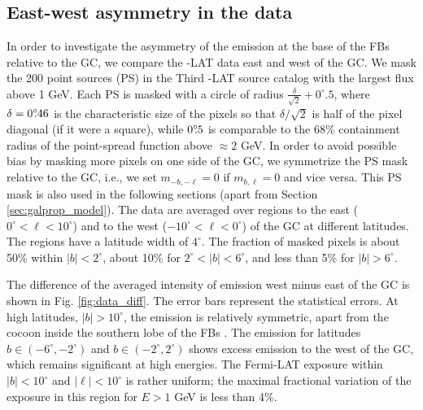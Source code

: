 \subsection{East-west  asymmetry in the data}
\label{sec:data_diff}

In order to investigate the asymmetry of the emission at the base of the FBs relative to the GC, 
we compare the \Fermi-LAT data east and west of the GC. 
We mask the 200 point sources (PS) in the Third \Fermi-LAT source catalog \citep[3FGL,][]{2015ApJS..218...23A}
with the largest flux above 1 GeV.
Each PS is masked with a circle of radius $\frac{\delta}{\sqrt{2}} + 0^\circ\!\!.5$, where $\delta = 0^\circ\!\!.46$ is the characteristic size of the pixels
so that ${\delta}/{\sqrt{2}}$ is half of the pixel diagonal (if it were a square), while $0^\circ\!\!.5$ is comparable to 
the 68\% containment radius of the point-spread function above $\approx 2$ GeV.
In order to avoid possible bias by masking more pixels on one side of the GC,
we symmetrize the PS mask relative to the GC, i.e., we set $m_{-b, -\ell} = 0$ if $m_{b, \ell} = 0$ and vice versa.
This PS mask is also used in the following sections (apart from Section \ref{sec:galprop_model}).
The data are averaged over regions to the east ($0^\circ < \ell < 10^\circ$) and to the west ($-10^\circ < \ell  <  0^\circ$) 
of the GC at different latitudes. 
The regions have a latitude width of $4^\circ$. 
The fraction of masked pixels is about 50\% within $|b| < 2^\circ$, about 10\% for $2^\circ < |b| < 6^\circ$, and less than  5\% 
for $|b| > 6^\circ$.

The difference of the averaged intensity of emission west minus east of the GC is shown in Fig. \ref{fig:data_diff}. 
The error bars represent the statistical errors.
At high latitudes, $|b| > 10^\circ$, the emission is relatively symmetric,
apart from the cocoon inside the southern lobe of the FBs \citep{2012ApJ...753...61S, 2014ApJ...793...64A}.
The emission for latitudes $b \in (-6^\circ, -2^\circ)$ and $b \in (-2^\circ, 2^\circ)$ shows excess emission to the west of the GC, 
which remains significant at high energies. 
The Fermi-LAT exposure within $|b| < 10^\circ$ and $|\ell| < 10^\circ$ is rather uniform; 
the maximal fractional variation of the exposure in this region for $E > 1$ GeV is less than 4\%.

